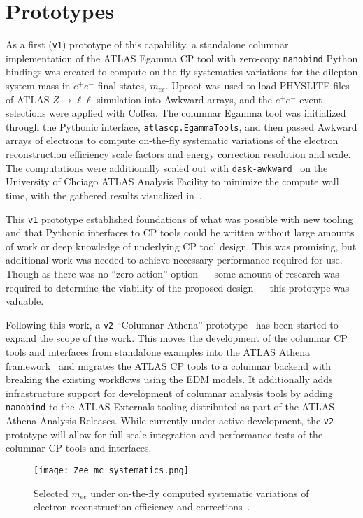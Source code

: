 \section{Prototypes}\label{sec:prototypes}

As a first (\texttt{v1}) prototype of this capability, a standalone columnar implementation of the ATLAS Egamma CP tool with zero-copy \texttt{nanobind} Python bindings was created to compute on-the-fly systematics variations for the dilepton system mass in $e^{+}e^{-}$ final states, $m_{ee}$.
Uproot was used to load PHYSLITE files of ATLAS $Z\to \ell\ell$ simulation into Awkward arrays, and the $e^{+}e^{-}$ event selections were applied with Coffea.
The columnar Egamma tool was initialized through the Pythonic interface, \texttt{atlascp.EgammaTools}, and then passed Awkward arrays of electrons to compute on-the-fly systematic variations of the electron reconstruction efficiency scale factors and energy correction resolution and scale.
The computations were additionally scaled out with \texttt{dask-awkward}~\cite{dask_awkward_2024} on the University of Chciago ATLAS Analysis Facility to minimize the compute wall time, with the gathered results visualized in~.

This \texttt{v1} prototype established foundations of what was possible with new tooling and that Pythonic interfaces to CP tools could be written without large amounts of work or deep knowledge of underlying CP tool design.
This was promising, but additional work was needed to achieve necessary performance required for use.
Though as there was no ``zero action'' option --- some amount of research was required to determine the viability of the proposed design --- this prototype was valuable.

Following this work, a \texttt{v2} ``Columnar Athena'' prototype~\cite{columnar_athena} has been started to expand the scope of the work.
This moves the development of the columnar CP tools and interfaces from standalone examples into the ATLAS Athena framework~\cite{ATLAS_Athena} and migrates the ATLAS CP tools to a columnar backend with breaking the existing workflows using the EDM models.
It additionally adds infrastructure support for development of columnar analysis tools by adding \texttt{nanobind} to the ATLAS Externals tooling distributed as part of the ATLAS Athena Analysis Releases.
While currently under active development, the \texttt{v2} prototype will allow for full scale integration and performance tests of the columnar CP tools and interfaces.

\begin{figure}
    \centering
    \texttt{[image: Zee\_mc\_systematics.png]}
    \caption{Selected $m_{ee}$ under on-the-fly computed systematic variations of electron reconstruction efficiency and corrections~\cite{Vigl:ACAT_2024}.}
    \label{fig:Zee_mc_systematics}
\end{figure}
